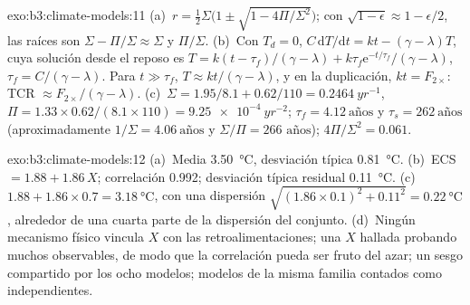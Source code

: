 \begin{solution}{exo:b3:climate-models:11}
(a)~$r = \tfrac12\Sigma\big(1 \pm \sqrt{1 - 4\Pi/\Sigma^2}\big)$; con
$\sqrt{1 - \epsilon} \approx 1 - \epsilon/2$, las raíces son $\Sigma -
\Pi/\Sigma \approx \Sigma$ y $\Pi/\Sigma$. (b)~Con $T_d = 0$, $C\,\mathrm
dT/\mathrm dt = kt - (\gamma - \lambda)T$, cuya solución desde el reposo es $T =
k(t - \tau_f)/(\gamma - \lambda) + k\tau_f\mathrm e^{-t/\tau_f}/(\gamma -
\lambda)$, $\tau_f = C/(\gamma - \lambda)$. Para $t \gg \tau_f$, $T \approx
kt/(\gamma - \lambda)$, y en la duplicación, $kt = F_{2\times}$: TCR
$\approx F_{2\times}/(\gamma - \lambda)$. (c)~$\Sigma = 1.95/8.1 +
0.62/110 = \qty{0.2464}{yr^{-1}}$, $\Pi = 1.33\times0.62/(8.1\times110) =
\qty{9.25e-4}{yr^{-2}}$; $\tau_f = \num{4.12}~\text{años}$ y $\tau_s =
\num{262}~\text{años}$ (aproximadamente $1/\Sigma = \num{4.06}~\text{años}$ y
$\Sigma/\Pi = \num{266}\text{ años}$); $4\Pi/\Sigma^2 = 0.061$.
\end{solution}

\begin{solution}{exo:b3:climate-models:12}
(a)~Media \qty{3.50}{\celsius}, desviación típica \qty{0.81}{\celsius}.
(b)~ECS $= 1.88 + 1.86\,X$; correlación \num{0.992}; desviación
típica residual \qty{0.11}{\celsius}. (c)~$1.88 + 1.86\times0.7 =
\qty{3.18}{\celsius}$, con una dispersión $\sqrt{(1.86\times0.1)^2 + 0.11^2} =
\qty{0.22}{\celsius}$, alrededor de una cuarta parte de la dispersión del conjunto.
(d)~Ningún mecanismo físico vincula $X$ con las retroalimentaciones; una $X$ hallada
probando muchos observables, de modo que la correlación pueda ser fruto del azar; un sesgo
compartido por los ocho modelos; modelos de la misma familia contados como
independientes.
\end{solution}

